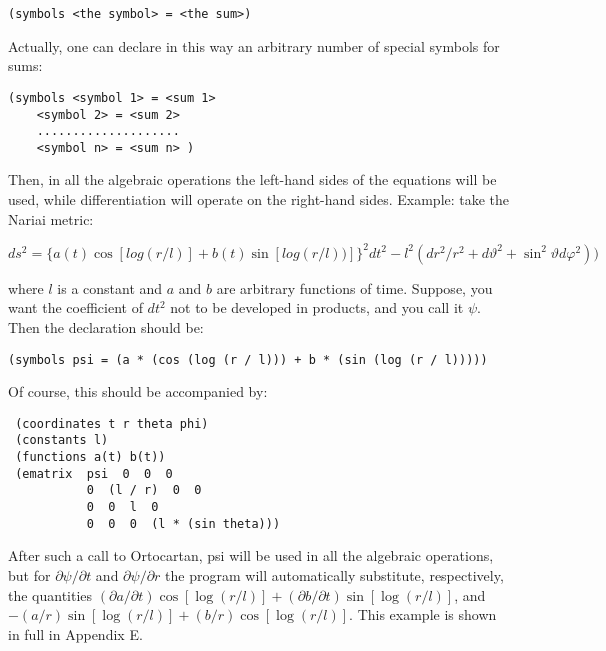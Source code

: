\bigskip

\begin{verbatim}
(symbols <the symbol> = <the sum>)
\end{verbatim}

\bigskip

\noindent Actually, one can declare in this way an arbitrary number of special
symbols for sums:

\bigskip

\begin{verbatim}
(symbols <symbol 1> = <sum 1>
    <symbol 2> = <sum 2>
    ....................
    <symbol n> = <sum n> )
\end{verbatim}

\bigskip

\noindent Then, in all the algebraic operations the left-hand sides of the
equations will be used, while differentiation will operate on the right-hand
sides. Example: take the Nariai metric:

$$ ds^2 = \{a(t) \cos[log (r/l)] + b(t) \sin[log (r/l))]\}^2 dt^2 -
l^2(dr^2/r^2 + d\vartheta^2 + \sin^2\vartheta d\varphi^2) ) $$

\noindent where $l$ is a constant and $a$ and $b$ are arbitrary functions of
time. Suppose, you want the coefficient of $dt^2$  not to  be developed in
products, and you call it $\psi$. Then the declaration should be:

\bigskip

\begin{verbatim}
(symbols psi = (a * (cos (log (r / l))) + b * (sin (log (r / l)))))
\end{verbatim}

\bigskip

\noindent Of course, this should be accompanied by:

\bigskip

\begin{verbatim}
 (coordinates t r theta phi)
 (constants l)
 (functions a(t) b(t))
 (ematrix  psi  0  0  0
           0  (l / r)  0  0
           0  0  l  0
           0  0  0  (l * (sin theta)))
\end{verbatim}

\bigskip

\noindent After such a call to Ortocartan, psi will be used in all the
algebraic operations, but for $\partial\psi/\partial t$ and $\partial
\psi/\partial r$ the program will automatically substitute, respectively, the
quantities $(\partial a/\partial t) \cos[\log(r/l)] + (\partial b/\partial t)
\sin[\log(r/l)]$, and $-(a/r) \sin[\log(r/l)] + (b/r) \cos[\log(r/l)]$. This
example is shown in full in Appendix E.

